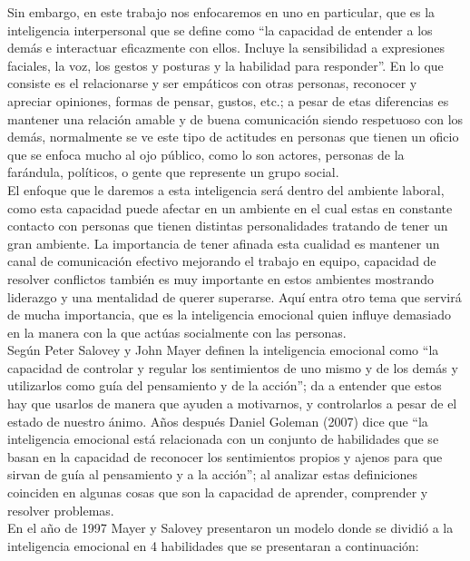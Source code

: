 Sin embargo, en este trabajo nos enfocaremos en uno en particular, que es la
inteligencia interpersonal que se define como “la capacidad de entender a los
demás e interactuar eficazmente con ellos. Incluye la sensibilidad a expresiones
faciales, la voz, los gestos y posturas y la habilidad para responder”. En lo
que consiste es el relacionarse y ser empáticos con otras personas, reconocer y
apreciar opiniones, formas de pensar, gustos, etc.; a pesar de etas diferencias
es mantener una relación amable y de buena comunicación siendo respetuoso con
los demás, normalmente se ve este tipo de actitudes en personas que tienen un
oficio que se enfoca mucho al ojo público, como lo son actores, personas de la
farándula, políticos, o gente que represente un grupo social.\\
El enfoque que le daremos a esta inteligencia será dentro del ambiente laboral,
como esta capacidad puede afectar en un ambiente en el cual estas en constante
contacto con personas que tienen distintas personalidades tratando de tener un
gran ambiente. La importancia de tener afinada esta cualidad es mantener un
canal de comunicación efectivo mejorando el trabajo en equipo, capacidad de
resolver conflictos también es muy importante en estos ambientes mostrando
liderazgo y una mentalidad de querer superarse. Aquí entra otro tema que servirá
de mucha importancia, que es la inteligencia emocional quien influye demasiado
en la manera con la que actúas socialmente con las personas.\\
Según Peter Salovey y John Mayer definen la inteligencia emocional como
“la capacidad de controlar y regular los sentimientos de uno mismo y de los
demás y utilizarlos como guía del pensamiento y de la acción”; da a entender que
estos hay que usarlos de manera que ayuden a motivarnos, y controlarlos a pesar
de el estado de nuestro ánimo. Años después Daniel Goleman (2007) dice que “la
inteligencia emocional está relacionada con un conjunto de habilidades que se
basan en la capacidad de reconocer los sentimientos propios y ajenos para que
sirvan de guía al pensamiento y a la acción”; al analizar estas definiciones
coinciden en algunas cosas que son la capacidad de aprender, comprender y
resolver problemas.\\
En el año de 1997 Mayer y Salovey presentaron un modelo donde se dividió a la
inteligencia emocional en 4 habilidades que se presentaran a continuación:
